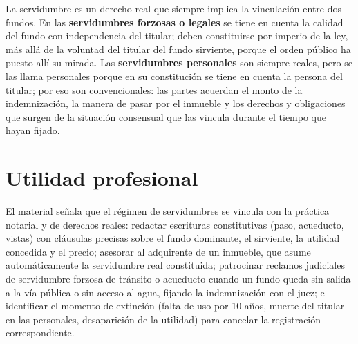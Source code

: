 \documentclass[12pt,oneside]{book}
\begin{document}
La servidumbre es un derecho real que siempre implica la vinculación entre dos fundos. En las \textbf{servidumbres forzosas o legales} se tiene en cuenta la calidad del fundo con independencia del titular; deben constituirse por imperio de la ley, más allá de la voluntad del titular del fundo sirviente, porque el orden público ha puesto allí su mirada. Las \textbf{servidumbres personales} son siempre reales, pero se las llama personales porque en su constitución se tiene en cuenta la persona del titular; por eso son convencionales: las partes acuerdan el monto de la indemnización, la manera de pasar por el inmueble y los derechos y obligaciones que surgen de la situación consensual que las vincula durante el tiempo que hayan fijado.

\section{Utilidad profesional}

El material señala que el régimen de servidumbres se vincula con la práctica notarial y de derechos reales: redactar escrituras constitutivas (paso, acueducto, vistas) con cláusulas precisas sobre el fundo dominante, el sirviente, la utilidad concedida y el precio; asesorar al adquirente de un inmueble, que asume automáticamente la servidumbre real constituida; patrocinar reclamos judiciales de servidumbre forzosa de tránsito o acueducto cuando un fundo queda sin salida a la vía pública o sin acceso al agua, fijando la indemnización con el juez; e identificar el momento de extinción (falta de uso por 10 años, muerte del titular en las personales, desaparición de la utilidad) para cancelar la registración correspondiente.
\end{document}
